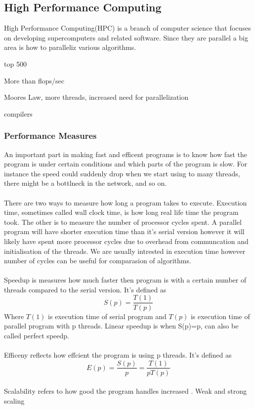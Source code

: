 \documentclass[10pt,a4paper]{article}
\begin{document}
\clearpage
\subsection{High Performance Computing}
High Performance Computing(HPC) is a branch of computer science that focuses on developing supercomputers and related software. Since they are parallel a big area is how to paralleliz various algorithms.

top 500\cite{TOP500}

More than flops/sec

Moores Law, more threads, increased need for parallelization

compilers\cite{intro_hpc}


\subsubsection{Performance Measures}
An important part in making fast and efficent programs is to know how fast the program is under certain conditions and which parts of the program is slow. For instance the speed could suddenly drop when we start using to many threads, there might be a bottlneck in the network, and so on.\\
\\
There are two ways to measure how long a program takes to execute. Execution time, sometimes called wall clock time, is how long real life time the program took. The other is to measure the number of processor cycles spent. A parallel program will have shorter execution time than it's serial version however it will likely have spent more processor cycles due to overhead from communcation and initialisation of the threads. We are usually intrested in execution time however number of cycles can be useful for comparasion of algorithms.\\
\\
Speedup is measures how much faster then program is with a certain number of threads compared to the serial version. It's defined as
$$S(p)=\frac{T(1)}{T(p)}$$
Where $T(1)$ is execution time of serial program and $T(p)$ is execution time of parallel program with p threads. Linear speedup is when S(p)=p, can also be called perfect speedp.\\
\\
Efficeny reflects how effcient the program is using p threads. It's defined as
$$E(p)=\frac{S(p)}{p}=\frac{T(1)}{pT(p)}$$
\\
Scalability refers to how good the program handles increased .
Weak and strong scaling
\end{document}
